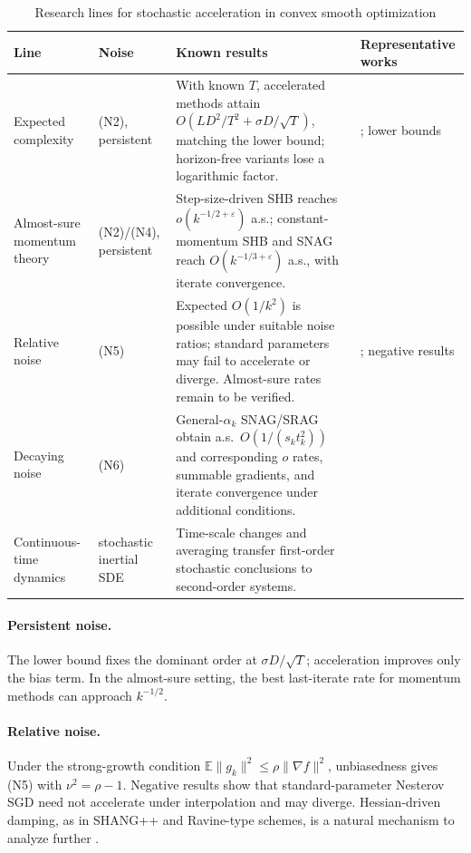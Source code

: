 \documentclass[11pt]{article}
\newcommand{\E}{\mathbb{E}}
\begin{document}
\begin{table}[htbp]
\centering
\small
\caption{Research lines for stochastic acceleration in convex smooth optimization}
\label{tab:lines}
\begin{tabularx}{\textwidth}{@{}p{2.2cm}p{2.3cm}Yp{3.0cm}@{}}
\toprule
Line & Noise & Known results & Representative works \\
\midrule
Expected complexity & (N2), persistent & With known $T$, accelerated methods attain $O(LD^2/T^2+\sigma D/\sqrt T)$, matching the lower bound; horizon-free variants lose a logarithmic factor. & \citet{lan2012,cutkosky2019anytime}; lower bounds \citet{nemirovski1983,agarwal2012} \\
\addlinespace
Almost-sure momentum theory & (N2)/(N4), persistent & Step-size-driven SHB reaches $o(k^{-1/2+\varepsilon})$ a.s.; constant-momentum SHB and SNAG reach $O(k^{-1/3+\varepsilon})$ a.s., with iterate convergence. & \citet{sebbouh2021,liu2022} \\
\addlinespace
Relative noise & (N5) & Expected $O(1/k^2)$ is possible under suitable noise ratios; standard parameters may fail to accelerate or diverge. Almost-sure rates remain to be verified. & \citet{vaswani2019fast,gupta2024nesterov,yu2026shang}; negative results \citet{kidambi2018insufficiency,liu2020accelerating} \\
\addlinespace
Decaying noise & (N6) & General-$\alpha_k$ SNAG/SRAG obtain a.s.\ $O(1/(s_kt_k^2))$ and corresponding $o$ rates, summable gradients, and iterate convergence under additional conditions. & \citet{attouch2026ravine,salzo2025iterates} \\
\addlinespace
Continuous-time dynamics & stochastic inertial SDE & Time-scale changes and averaging transfer first-order stochastic conclusions to second-order systems. & \citet{maulensoto2026stochastic,maulensoto2025sde} \\
\bottomrule
\end{tabularx}
\end{table}

\paragraph{Persistent noise.} The lower bound fixes the dominant order at $\sigma D/\sqrt T$; acceleration improves only the bias term. In the almost-sure setting, the best last-iterate rate for momentum methods can approach $k^{-1/2}$.

\paragraph{Relative noise.} Under the strong-growth condition $\E\|g_k\|^2\le\rho\|\nabla f\|^2$, unbiasedness gives (N5) with $\nu^2=\rho-1$. Negative results show that standard-parameter Nesterov SGD need not accelerate under interpolation and may diverge. Hessian-driven damping, as in SHANG++ and Ravine-type schemes, is a natural mechanism to analyze further \citep{yu2026shang,attouch2026ravine}.
\end{document}
